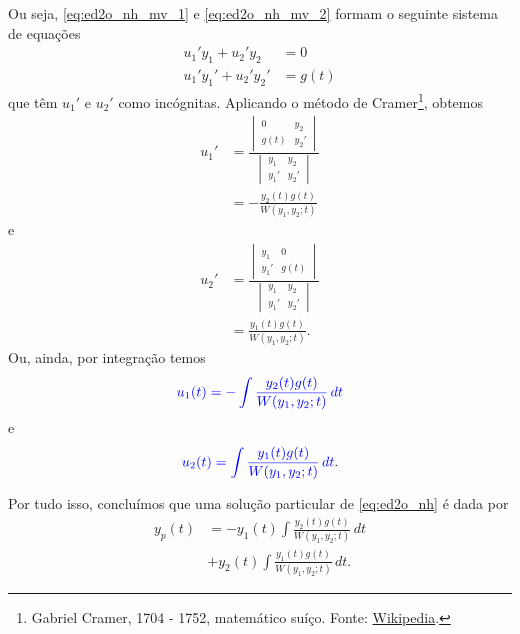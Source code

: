 Ou seja, \eqref{eq:ed2o_nh_mv_1} e \eqref{eq:ed2o_nh_mv_2} formam o seguinte sistema de equações
\begin{align}
  u_1'y_1 + u_2'y_2 &= 0\\
  u_1'y_1' + u_2'y_2' &= g(t)
\end{align}
que têm $u_1'$ e $u_2'$ como incógnitas. Aplicando o método de Cramer\footnote{Gabriel Cramer, 1704 - 1752, matemático suíço. Fonte: \href{https://en.wikipedia.org/wiki/Gabriel_Cramer}{Wikipedia}.}, obtemos
\begin{align}
  u_1' &= \frac{
         \begin{vmatrix}
           0 & y_2\\
           g(t) & y_2'
         \end{vmatrix}
}{
                  \begin{vmatrix}
                    y_1 & y_2\\
                    y_1' & y_2'
                  \end{vmatrix}
}\\
       &= -\frac{y_2(t)g(t)}{W(y_1,y_2;t)}
\end{align}
e
\begin{align}
  u_2' &= \frac{
         \begin{vmatrix}
           y_1 & 0 \\
           y_1' & g(t)
         \end{vmatrix}
}{
                  \begin{vmatrix}
                    y_1 & y_2\\
                    y_1' & y_2'                    
                  \end{vmatrix}
} \\
       &= \frac{y_1(t)g(t)}{W(y_1,y_2;t)}.
\end{align}
Ou, ainda, por integração temos
\begin{equation}\label{eq:ed2o_nh_vp_u1}
  {\color{blue}u_1(t) = -\int \frac{y_2(t)g(t)}{W(y_1,y_2;t)}\,dt}
\end{equation}
e
\begin{equation}\label{eq:ed2o_nh_vp_u2}
  {\color{blue}u_2(t) = \int \frac{y_1(t)g(t)}{W(y_1,y_2;t)}\,dt}.
\end{equation}

Por tudo isso, concluímos que uma solução particular de \eqref{eq:ed2o_nh} é dada por
\begin{align}
  y_p(t) &= -y_1(t)\int \frac{y_2(t)g(t)}{W(y_1,y_2;t)}\,dt \\
         &+ y_2(t)\int \frac{y_1(t)g(t)}{W(y_1,y_2;t)}\,dt.
\end{align}

